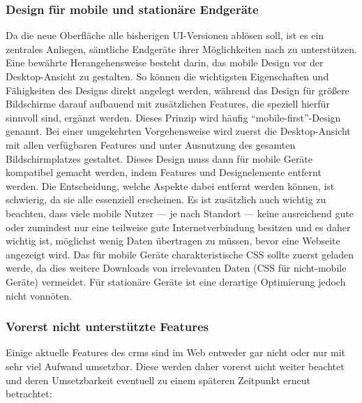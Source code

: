 \subsubsection{Design für mobile und stationäre Endgeräte}
Da die neue Oberfläche alle bisherigen UI-Versionen ablösen soll, ist es ein zentrales Anliegen, sämtliche Endgeräte ihrer Möglichkeiten nach zu unterstützen. Eine bewährte Herangehensweise besteht darin, das mobile Design vor der Desktop-Ansicht zu gestalten. So können die wichtigsten Eigenschaften und Fähigkeiten des Designs direkt angelegt werden, während das Design für größere Bildschirme darauf aufbauend mit zusätzlichen Features, die speziell hierfür sinnvoll sind, ergänzt werden. Dieses Prinzip wird häufig ``mobile-first''-Design genannt. Bei einer umgekehrten Vorgehensweise wird zuerst die Desktop-Ansicht mit allen verfügbaren Features und unter Ausnutzung des gesamten Bildschirmplatzes gestaltet. Dieses Design muss dann für mobile Geräte kompatibel gemacht werden, indem Features und Designelemente entfernt werden. Die Entscheidung, welche Aspekte dabei entfernt werden können, ist schwierig, da sie alle essenziell erscheinen.
Es ist zusätzlich auch wichtig zu beachten, dass viele mobile Nutzer --- je nach Standort --- keine ausreichend gute oder zumindest nur eine teilweise gute Internetverbindung besitzen und es daher wichtig ist, möglichst wenig Daten übertragen zu müssen, bevor eine Webseite angezeigt wird. Das für mobile Geräte charakteristische CSS sollte zuerst geladen werde, da dies weitere Downloads von irrelevanten Daten (CSS für nicht-mobile Geräte) vermeidet. Für stationäre Geräte ist eine derartige Optimierung jedoch nicht vonnöten.

\subsubsection{Vorerst nicht unterstützte Features}
Einige aktuelle Features des \gls{crm}s sind im Web entweder gar nicht oder nur mit sehr viel Aufwand umsetzbar. Diese werden daher vorerst nicht weiter beachtet und deren Umsetzbarkeit eventuell zu einem späteren Zeitpunkt erneut betrachtet:

